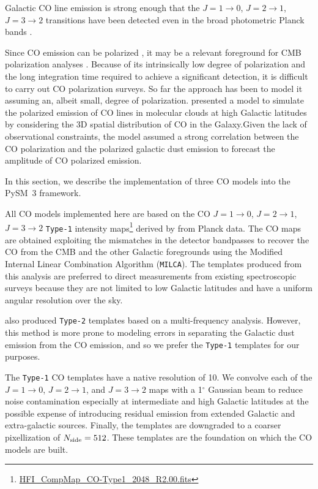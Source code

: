 \documentclass[twocolumn]{aastex631}
\begin{document}
Galactic CO line emission is strong enough that the $J = 1\rightarrow0$, $J = 2\rightarrow1$, $J = 3\rightarrow2$ transitions have been detected even in the broad photometric Planck bands \citep{planck2013-p03a, planck2014-a12}. 

Since CO emission can be polarized \citep{Goldreich:1981}, it may be a relevant foreground for CMB polarization analyses \citep{Puglisi:2017}. 
Because of its intrinsically low degree of polarization and the long integration time required to achieve a significant detection,  it is difficult to carry out CO polarization surveys. So far the approach has been to model it assuming an, albeit small, degree of polarization. \citet{Puglisi:2017} presented a model to simulate the polarized emission of CO lines in molecular clouds at high Galactic latitudes by considering the 3D spatial distribution of CO in the Galaxy.Given the lack of observational constraints, the model assumed a strong correlation between the CO polarization and the polarized galactic dust emission to forecast the amplitude of CO polarized emission.

In this section, we describe the implementation of three CO models into the PySM~3 framework.



All CO models implemented here are based on the CO $J = 1\rightarrow0$, $J = 2\rightarrow1$, $J = 3\rightarrow2$ \texttt{Type-1} intensity maps\footnote{\url{HFI_CompMap_CO-Type1_2048_R2.00.fits}} derived by \citet{planck2013-p03a} from Planck data. The CO maps are obtained exploiting the mismatches in the detector bandpasses to recover the CO from the CMB and the other Galactic foregrounds using the Modified Internal Linear Combination Algorithm (\texttt{MILCA}). The templates produced from this analysis are preferred to direct measurements from existing spectroscopic surveys \citep[e.g.,][]{Dame:2001} because they are not limited to low Galactic latitudes and have a uniform angular resolution over the sky.

\citet{planck2013-p03a} also produced \texttt{Type-2} templates based on a multi-frequency analysis. However, this method is more prone to modeling errors in separating the Galactic dust emission from the CO emission, and so we prefer the \texttt{Type-1} templates for our purposes.

The \texttt{Type-1} CO templates have a native resolution of 10\arcmin. We convolve each of the $J = 1\rightarrow0$, $J = 2\rightarrow1$, and $J = 3\rightarrow2$ maps with a 1$^\circ$ Gaussian beam to reduce noise contamination especially at intermediate and high Galactic latitudes at the possible expense of introducing residual emission from extended Galactic and extra-galactic sources. Finally, the templates are downgraded to a coarser pixellization of $N_{\rm side} = 512$. These templates are the foundation on which the CO models are built.
\end{document}

